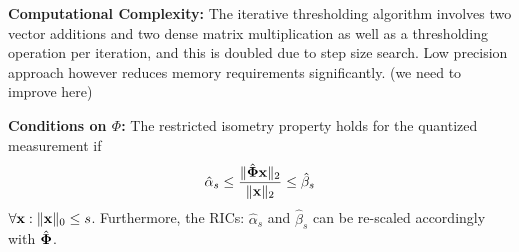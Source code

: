 \documentclass{article}
\begin{document}
{\bf Computational Complexity:} The iterative thresholding algorithm involves two vector additions and two dense matrix multiplication as well as a thresholding operation per iteration, and this is doubled due to step size search. Low precision approach however reduces memory requirements significantly. (we need to improve here)
 
{\bf Conditions on ${\Phi}$:} The restricted isometry property holds for the quantized measurement if
\begin{equation}
    \hat{\alpha}_{s} \leq \frac{\|\hat{{\bf \Phi}} {\bf x}\|_2}{\|{\bf x}\|_2} \leq \hat{\beta}_{s}
\end{equation}
$\forall {\bf x}: \| {\bf x}\|_0 \leq s$. Furthermore, the RICs: $\hat{\alpha}_s$ and $\hat{\beta}_s$ can be re-scaled accordingly with $\hat{\bf \Phi}$.

\end{document}
